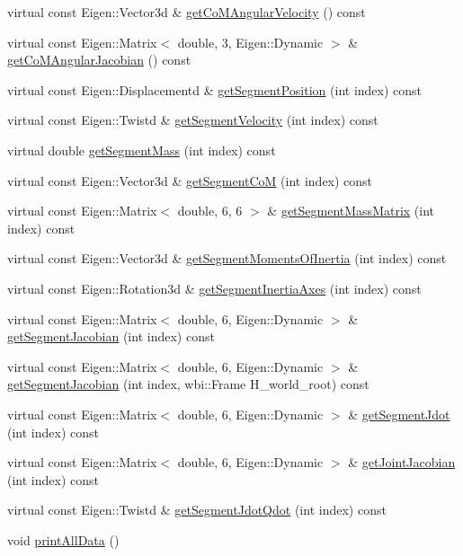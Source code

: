 \begin{DoxyCompactItemize}
virtual const Eigen\+::\+Vector3d \& \hyperlink{classocra__icub_1_1OcraWbiModel_a48de3ef0a8531b4f1f68d4d53288b1e4}{get\+Co\+M\+Angular\+Velocity} () const
\item 
virtual const Eigen\+::\+Matrix$<$ double, 3, Eigen\+::\+Dynamic $>$ \& \hyperlink{classocra__icub_1_1OcraWbiModel_aca6a017f40a432142653bf3fa50f425d}{get\+Co\+M\+Angular\+Jacobian} () const
\item 
virtual const Eigen\+::\+Displacementd \& \hyperlink{classocra__icub_1_1OcraWbiModel_acb6a8faee8b9f32fdea179c2103be606}{get\+Segment\+Position} (int index) const
\item 
virtual const Eigen\+::\+Twistd \& \hyperlink{classocra__icub_1_1OcraWbiModel_a30e1597e69afd309c648ce7e1036f899}{get\+Segment\+Velocity} (int index) const
\item 
virtual double \hyperlink{classocra__icub_1_1OcraWbiModel_a54db828a81022e7855845bb0ce9d22aa}{get\+Segment\+Mass} (int index) const
\item 
virtual const Eigen\+::\+Vector3d \& \hyperlink{classocra__icub_1_1OcraWbiModel_a40e740aac3a79f6e607768b5bae9affb}{get\+Segment\+CoM} (int index) const
\item 
virtual const Eigen\+::\+Matrix$<$ double, 6, 6 $>$ \& \hyperlink{classocra__icub_1_1OcraWbiModel_ac8cdf27453a0a6856d35bec89da2db40}{get\+Segment\+Mass\+Matrix} (int index) const
\item 
virtual const Eigen\+::\+Vector3d \& \hyperlink{classocra__icub_1_1OcraWbiModel_a38d92d1a46b637d47b4588725e5dec8e}{get\+Segment\+Moments\+Of\+Inertia} (int index) const
\item 
virtual const Eigen\+::\+Rotation3d \& \hyperlink{classocra__icub_1_1OcraWbiModel_aaba3e74c964c1b7b2645aeae5bb5ade9}{get\+Segment\+Inertia\+Axes} (int index) const
\item 
virtual const Eigen\+::\+Matrix$<$ double, 6, Eigen\+::\+Dynamic $>$ \& \hyperlink{classocra__icub_1_1OcraWbiModel_a46613002aff4de4170c671bb5a6eab5c}{get\+Segment\+Jacobian} (int index) const
\item 
virtual const Eigen\+::\+Matrix$<$ double, 6, Eigen\+::\+Dynamic $>$ \& \hyperlink{classocra__icub_1_1OcraWbiModel_ac1e91eca8bd09fee58de68e3a6c1b670}{get\+Segment\+Jacobian} (int index, wbi\+::\+Frame H\+\_\+world\+\_\+root) const
\item 
virtual const Eigen\+::\+Matrix$<$ double, 6, Eigen\+::\+Dynamic $>$ \& \hyperlink{classocra__icub_1_1OcraWbiModel_aa195933567eef064020e889f4ee7ad94}{get\+Segment\+Jdot} (int index) const
\item 
virtual const Eigen\+::\+Matrix$<$ double, 6, Eigen\+::\+Dynamic $>$ \& \hyperlink{classocra__icub_1_1OcraWbiModel_a80a97ad74f71529119c6417935ecbde1}{get\+Joint\+Jacobian} (int index) const
\item 
virtual const Eigen\+::\+Twistd \& \hyperlink{classocra__icub_1_1OcraWbiModel_ac013379f185b03cbf092c6388e21ddcc}{get\+Segment\+Jdot\+Qdot} (int index) const
\item 
void \hyperlink{classocra__icub_1_1OcraWbiModel_a309b3554c4eefda46c05b766476f40fb}{print\+All\+Data} ()
\end{DoxyCompactItemize}
